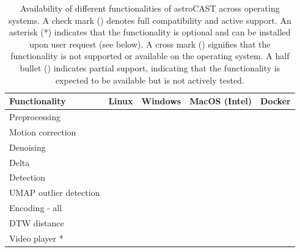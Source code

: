 \documentclass[utf8]{FrontiersinHarvard}
\newcommand{\cmark}{\ding{51}} %
\newcommand{\xmark}{\textemdash} %
\newcommand{\halfbullet}{\LEFTcircle} %
\newcommand{\optional}{*} %
\begin{document}
    \bgroup
    \def\arraystretch{1.5}
    \begin{table}[htb]
        \centering
        \caption{Availability of different functionalities of astroCAST across
        operating systems. A check mark (\cmark) denotes full compatibility and active support. An asterisk (\optional)
            indicates that the
            functionality is optional and can be installed upon user request (see below). A cross mark (\xmark) signifies
            that the
            functionality is not supported or available on the operating system. A half bullet (\halfbullet) indicates
            partial support,
            indicating that the functionality is expected to be available but is not actively tested. \newline}
        \label{tab:functionalities}
        \begin{tabular}{|l|c|c|c|c|}
            \hline
            \textbf{Functionality} & \textbf{Linux} & \textbf{Windows} & \textbf{MacOS (Intel)} & \textbf{Docker} \\ \hline
            Preprocessing          & \cmark         & \cmark           & \cmark                 & \cmark          \\ \hline
            Motion correction      & \cmark         & \cmark           & \cmark                 & \cmark          \\ \hline
            Denoising              & \cmark         & \halfbullet      & \cmark                 & \cmark          \\ \hline
            Delta                  & \cmark         & \cmark           & \cmark                 & \cmark          \\ \hline
            Detection              & \cmark         & \cmark           & \cmark                 & \cmark          \\ \hline
            UMAP outlier detection & \cmark         & \cmark           & \xmark                 & \cmark          \\ \hline
            Encoding - all         & \cmark         & \cmark           & \cmark                 & \cmark          \\ \hline
            DTW distance           & \cmark         & \cmark           & \xmark                 & \cmark          \\ \hline
            Video player \optional & \cmark         & \cmark           & \cmark                 & \xmark          \\ \hline
        \end{tabular}
    \end{table}
    \egroup
\end{document}

